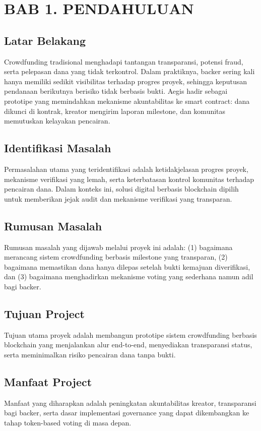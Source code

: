 \documentclass[12pt]{article}
\begin{document}
\newpage

\section{BAB 1. PENDAHULUAN}
\subsection{Latar Belakang}
Crowdfunding tradisional menghadapi tantangan transparansi, potensi fraud, serta pelepasan dana yang tidak terkontrol. Dalam praktiknya, backer sering kali hanya memiliki sedikit visibilitas terhadap progres proyek, sehingga keputusan pendanaan berikutnya berisiko tidak berbasis bukti. Aegis hadir sebagai prototipe yang memindahkan mekanisme akuntabilitas ke smart contract: dana dikunci di kontrak, kreator mengirim laporan milestone, dan komunitas memutuskan kelayakan pencairan.

\subsection{Identifikasi Masalah}
Permasalahan utama yang teridentifikasi adalah ketidakjelasan progres proyek, mekanisme verifikasi yang lemah, serta keterbatasan kontrol komunitas terhadap pencairan dana. Dalam konteks ini, solusi digital berbasis blockchain dipilih untuk memberikan jejak audit dan mekanisme verifikasi yang transparan.

\subsection{Rumusan Masalah}
Rumusan masalah yang dijawab melalui proyek ini adalah: (1) bagaimana merancang sistem crowdfunding berbasis milestone yang transparan, (2) bagaimana memastikan dana hanya dilepas setelah bukti kemajuan diverifikasi, dan (3) bagaimana menghadirkan mekanisme voting yang sederhana namun adil bagi backer.

\subsection{Tujuan Project}
Tujuan utama proyek adalah membangun prototipe sistem crowdfunding berbasis blockchain yang menjalankan alur end-to-end, menyediakan transparansi status, serta meminimalkan risiko pencairan dana tanpa bukti.

\subsection{Manfaat Project}
Manfaat yang diharapkan adalah peningkatan akuntabilitas kreator, transparansi bagi backer, serta dasar implementasi governance yang dapat dikembangkan ke tahap token-based voting di masa depan.
\end{document}
